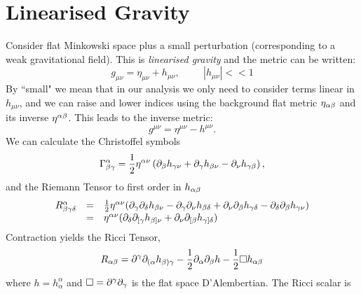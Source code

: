 
\section{Linearised Gravity}
Consider flat Minkowski space plus a small perturbation (corresponding to a weak gravitational field). This is \textit{linearised gravity} and the metric can be written:
\begin{equation}
g_{\mu \nu} = \eta_{\mu \nu} + h_{\mu \nu}, \hspace{1cm} | h_{\mu \nu} | <<1
\end{equation}
By ``small" we mean that in our analysis we only need to consider terms linear in $h_{\mu \nu}$, and we can raise and lower indices using the background flat metric $\eta_{{\alpha} {\beta}}$ and its inverse $\eta^{{\alpha} {\beta}}$. This leads to the inverse metric:
\begin{equation}
g^{\mu \nu} = \eta^{\mu \nu} - h^{\mu \nu}.
\end{equation}
We can calculate the Christoffel symbols
\begin{equation}
\Gamma^\alpha_{\beta \gamma} = \frac{1}{2} \eta^{\alpha \nu} \left( {\partial}_\beta h_{\gamma \nu}+{\partial}_\gamma h_{\beta \nu}-{\partial}_\nu h_{\gamma \beta} \right),
\end{equation}
and the Riemann Tensor to first order in $h_{{\alpha} {\beta}}$
\begin{equation}\label{LinRie}
\begin{array}{lcl}
R^{{\alpha}}_{{\beta} \gamma \delta}&=&\frac{1}{2} \eta^{\alpha \nu} ({\partial}_\gamma {\partial}_\delta h_{{\beta} \nu} -{\partial}_\gamma {\partial}_\nu h_{{\beta} \delta} +{\partial}_\nu {\partial}_\beta h_{\gamma \delta} -{\partial}_\delta {\partial}_{\beta} h_{\gamma \nu} )\\
&=& \eta^{\alpha \nu}({\partial}_{\delta} {\partial}_{[\gamma} h_{\beta] \nu} + {\partial}_{\nu} {\partial}_{[\beta} h_{\gamma]\delta})
\end{array}
\end{equation}
Contraction yields the Ricci Tensor,
\begin{equation}
R_{\alpha \beta}={\partial}^\gamma {\partial}_{( \alpha}h_{\beta ) \gamma}  -\frac{1}{2}{\partial}_\alpha {\partial}_\beta h- \frac{1}{2} \Box h_{\alpha \beta}
\end{equation}
where $h=h^\alpha_\alpha$ and $\Box = {\partial}^\gamma {\partial}_\gamma$ is the flat space D'Alembertian. The Ricci scalar is
